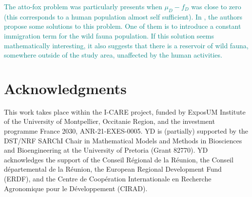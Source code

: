 \documentclass{article}
\newcommand{\vquatre}[1]{\textcolor{teal}{#1}}
\theoremstyle{definition}
\theoremstyle{remark}
\begin{document}
\vquatre{
The atto-fox problem was particularly presents when $\mu_D - f_D$ was close to zero (this corresponds to a human population almost self sufficient). In \cite{lobry_migrations_2015}, the authors propose some solutions to this problem. One of them is to introduce a constant immigration term for the wild fauna population. If this solution seems mathematically interesting, it also suggests that there is a reservoir of wild fauna, somewhere outside of the study area, unaffected by the human activities.
}


\section*{Acknowledgments}
This work takes place within the I-CARE project, funded by ExposUM Institute of the University of Montpellier, Occitanie Region, and the investment programme France 2030, ANR-21-EXES-0005. YD is (partially) supported by the DST/NRF SARChI Chair in Mathematical Models and Methods in Biosciences and Bioengineering at the University of Pretoria (Grant 82770). YD acknowledges the support of the Conseil R\'egional de la R\'eunion, the Conseil d\'epartemental de la R\'eunion, the European Regional Development Fund (ERDF), and the Centre de Coop\'eration Internationale en Recherche Agronomique pour le D\'eveloppement (CIRAD).

\newpage
\end{document}
